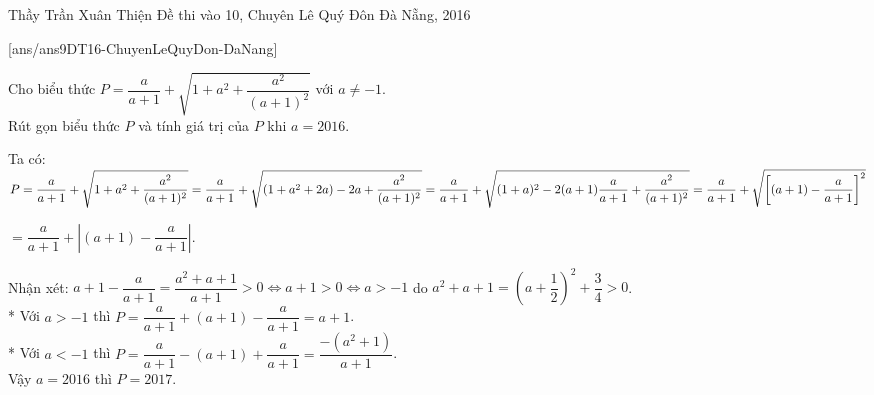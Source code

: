 \begin{name}
{Thầy  Trần Xuân Thiện}
{Đề thi vào 10, Chuyên Lê Quý Đôn Đà Nẵng, 2016}
\end{name}
\setcounter{ex}{0}
[ans/ans9DT16-ChuyenLeQuyDon-DaNang]
\begin{ex}%
Cho biểu thức $P=\dfrac{a}{a+1}+\sqrt{1+a^{2}+\dfrac{a^{2}}{(a+1)^{2}}}$ với $a \neq -1$.\\
Rút gọn biểu thức $P$ và tính giá trị của $P$ khi $a = 2016$.
\loigiai
    {Ta có: \\
$P=\dfrac{a}{a+1}+\sqrt{1+a^2+\dfrac{a^2}{(a+1)^2}}=\dfrac{a}{a+1}+\sqrt{(1+a^2+2a)-2a+\dfrac{a^2}{(a+1)^2}} \\
=\dfrac{a}{a+1}+\sqrt{(1+a)^2-2(a+1)\dfrac{a}{a+1}+\dfrac{a^2}{(a+1)^2}}=\dfrac{a}{a+1}+\sqrt{\left[(a+1)-\dfrac{a}{a+1}\right]^2}$\\
\begin{center}
$= \dfrac{a}{a+1}+\left| {(a+1)-\dfrac{a}{a+1}} \right|$.
\end{center}
Nhận xét: 
$a+1-\dfrac{a}{a+1}=\dfrac{a^2+a+1}{a+1}>0 \Leftrightarrow a+1>0 \Leftrightarrow a>-1$ do $a^2+a+1=(a+\dfrac{1}{2})^2+\dfrac{3}{4}>0$.\\
* Với $a > -1 $ thì $P = \dfrac{a}{a+1}+(a+1)-\dfrac{a}{a+1}=a+1$.\\
* Với $a < -1 $ thì $P = \dfrac{a}{a+1}-(a+1)+\dfrac{a}{a+1}=\dfrac{-(a^2+1)}{a+1}$.\\
Vậy $a=2016$ thì $P=2017$.
    }
\end{ex}

